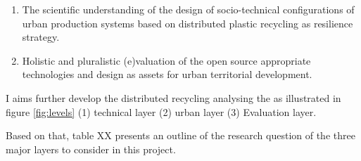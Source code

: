 \documentclass[
  12pt,
  a4paperpaper,
  onecolumn]{article}
\providecommand{\tightlist}{%
  \setlength{\itemsep}{0pt}\setlength{\parskip}{0pt}}\usepackage{longtable,booktabs,array}
\begin{document}
\begin{enumerate}
\def\labelenumi{\arabic{enumi})}
\tightlist
\item
  The scientific understanding of the design of socio-technical
  configurations of urban production systems based on distributed
  plastic recycling as resilience strategy.\\
\item
  Holistic and pluralistic (e)valuation of the open source appropriate
  technologies and design as assets for urban territorial development.
\end{enumerate}

I aims further develop the distributed recycling analysing the as
illustrated in figure \ref{fig:levels} (1) technical layer (2) urban
layer (3) Evaluation layer.

Based on that, table XX presents an outline of the research question of
the three major layers to consider in this project.

\small
\end{document}
